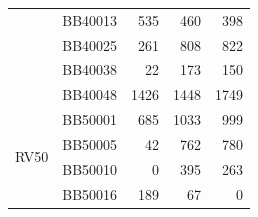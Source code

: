 \begin{table}[htbp]
\begin{tabular}{|c|l|r|r|r|}
		\cline{2-5}          & BB40013 & 535   & 460   & 398 \\
		\cline{2-5}     & BB40025 & 261   & 808   & 822 \\
		\cline{2-5}     & BB40038 & 22    & 173   & 150 \\
		\cline{2-5}     & BB40048 & 1426  & 1448  & 1749 \\
		\hline
		\multirow{4}{*}{RV50} & BB50001 & 685   & 1033  & 999 \\
		\cline{2-5}          & BB50005 & 42    & 762   & 780 \\
		\cline{2-5}          & BB50010 & 0     & 395   & 263 \\
		\cline{2-5}          & BB50016 & 189   & 67    & 0 \\
		\hline
	\end{tabular}%
	\label{tab:superior_solutions}%
\end{table}%




